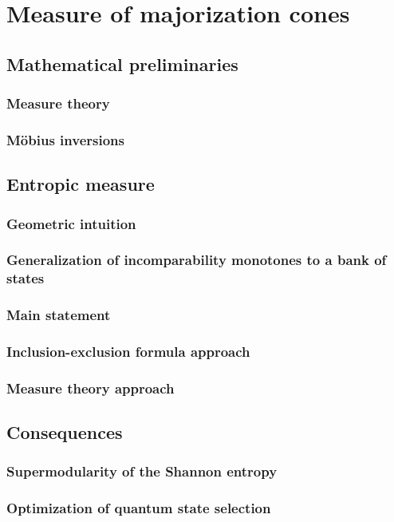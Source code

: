 \chapter{Measure of majorization cones}

\section{Mathematical preliminaries}

\subsection{Measure theory}

\subsection{Möbius inversions}

\section{Entropic measure}

\subsection{Geometric intuition}

\subsection{Generalization of incomparability monotones to a bank of states}

\subsection{Main statement}

\subsection{Inclusion-exclusion formula approach}

\subsection{Measure theory approach}

\section{Consequences}

\subsection{Supermodularity of the Shannon entropy}

\subsection{Optimization of quantum state selection}
